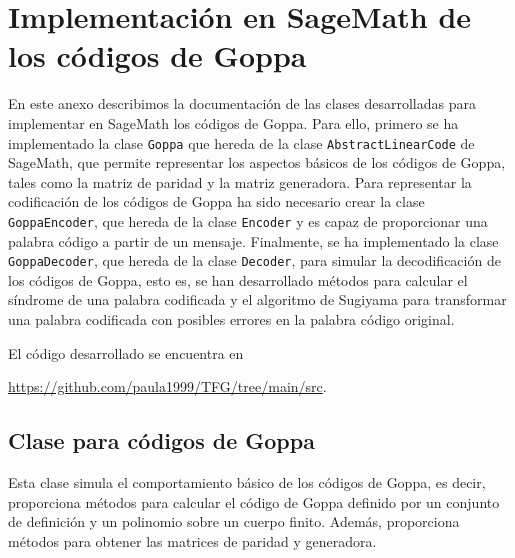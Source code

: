 \chapter[Implementación en SageMath de los códigos de Goppa]{Implementación en SageMath de los códigos de Goppa}
\label{annex:sage-Goppa}

En este anexo describimos la documentación de las clases desarrolladas para implementar en SageMath los códigos de Goppa. Para ello, primero se ha implementado la clase \texttt{Goppa} que hereda de la clase \texttt{AbstractLinearCode} de SageMath, que permite representar los aspectos básicos de los códigos de Goppa, tales como la matriz de paridad y la matriz generadora. Para representar la codificación de los códigos de Goppa ha sido necesario crear la clase \texttt{GoppaEncoder}, que hereda de la clase \texttt{Encoder} y es capaz de proporcionar una palabra código a partir de un mensaje. Finalmente, se ha implementado la clase \texttt{GoppaDecoder}, que hereda de la clase \texttt{Decoder}, para simular la decodificación de los códigos de Goppa, esto es, se han desarrollado métodos para calcular el síndrome de una palabra codificada y el algoritmo de Sugiyama para transformar una palabra codificada con posibles errores en la palabra código original.

El código desarrollado se encuentra en
\begin{center}
    \url{https://github.com/paula1999/TFG/tree/main/src}.
\end{center}

\section{Clase para códigos de Goppa}

Esta clase simula el comportamiento básico de los códigos de Goppa, es decir, proporciona métodos para calcular el código de Goppa definido por un conjunto de definición y un polinomio sobre un cuerpo finito. Además, proporciona métodos para obtener las matrices de paridad y generadora.

